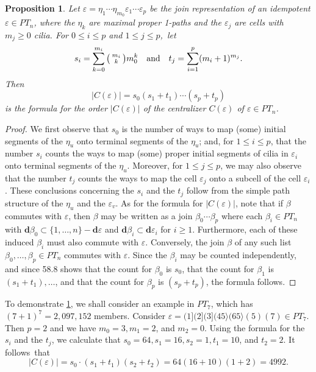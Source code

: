 \documentclass{surv-l}
\numberwithin{equation}{section}
\numberwithin{table}{section}
\numberwithin{figure}{section}
\theoremstyle{plain}
\newtheorem{proposition}[equation]{Proposition}
\theoremstyle{definition}
\begin{document}
\begin{proposition}\label{prop12.59.1}
Let $\varepsilon
=\eta_{1}\cdots\eta_{m_{0}}\varepsilon_{1}\cdots\varepsilon_{p}$
be the join representation of an idempotent $\varepsilon \in
PT_{n}$, where the $\eta_{k}$ are maximal proper 1-paths and the
$\varepsilon_{j}$ are cells with $m_{j}\geq 0$ cilia. For $0\leq
i\leq p$ and $1\leq j\leq p$,~let
\[
s_{i}=\sum_{k=0}^{m_{i}} \big(\kern0.5pt\begin{smallmatrix}
m_{i}\\
k\end{smallmatrix}\kern0.5pt\big)m_{0}^{k}\quad \text{and}\quad t_{j}=\sum_{i=1}^{p}(m_{i}+1)^{m_{j}}.
\]
Then
\[
|C(\varepsilon)|=s_{0}(s_{1}+t_{1})\cdots(s_{p}+t_{p})
\]
is the formula for the order $|C(\varepsilon)|$ of the centralizer
$C(\varepsilon)$ of $\varepsilon\in PT_{n}$.
\end{proposition}

\begin{proof} We first observe that $s_{0}$ is the number of ways to map
(some) initial segments of the $\eta_{u}$ onto terminal segments
of the $\eta_{u}$; and, for $1\leq i\leq p$, that the number
$s_{i}$ counts the ways to map (some) proper initial segments of
cilia in $\varepsilon_{i}$ onto terminal segments of the
$\eta_{u}$. Moreover, for $1\leq j\leq p$, we may also observe
that the number $t_{j}$ counts the ways to map the cell
$\varepsilon_{j}$ onto a subcell of the cell $\varepsilon_i$.
These conclusions concerning the $s_{i}$ and the $t_{j}$ follow
from the simple path structure of the $\eta_{u}$ and the
$\varepsilon_{v}$. As for the formula for $|C(\varepsilon)|$, note
that if $\beta$ commutes with $\varepsilon$, then $\beta$ may be
written as a join $\beta_{0}\cdots\beta_{p}$ where each
$\beta_{i}\in PT_{n}$ with $\mathbf{d}\beta_{0}\subset\{1,\ldots,
n\} -\mathbf{d}\varepsilon$ and $\mathbf{d}\beta_{i}\subset
\mathbf{d}\varepsilon_{i}$ for $i\geq 1$. Furthermore, each of
these induced $\beta_{i}$ must also commute with $\varepsilon$.
Conversely, the join $\beta$ of any such list $\beta_{0},\ldots,
\beta_{p}\in PT_{n}$ commutes with $\varepsilon$. Since the
$\beta_{i}$ may be counted independently, and since 58.8 shows
that the count for $\beta_{0}$ is $s_0$, that the count for
$\beta_{1}$ is $(s_{1}+t_{1}),\ldots$, and that the count for
$\beta_{p}$ is $(s_{p}+t_{p})$, the formula follows.
\end{proof}

To demonstrate \ref{prop12.59.1}, we shall consider an example in
$PT_{7}$, which has $(7+1)^{7}=2,097,152$ members. Consider
$\varepsilon=(1](2](3](45\rangle(65\rangle(5)(7)\in PT_{7}$. Then
$p=2$ and we have $m_{0}=3, m_{1}=2$, and $m_{2}=0$. Using the
formula for the $s_{i}$ and the $t_{j}$, we calculate that
$s_{0}=64, s_{1}=16, s_{2}=1, t_{1}=10$, and $t_{2}=2$. It
follows~that
\[
|C(\varepsilon)|=s_{0}\cdot(s_{1}+t_{1})(s_{2}+t_{2})=64(16+10)(1+2)=4992.
\]
\end{document}

